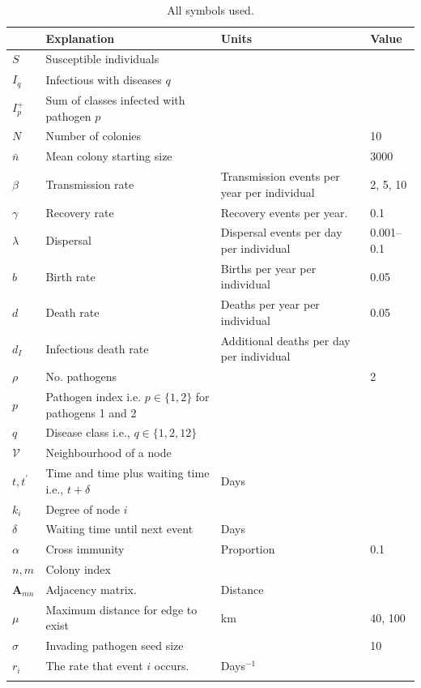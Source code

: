 \begin{table}[b!]

\begin{tabular}{lp{5.6cm}p{4.3cm}l}
 & Explanation & Units&Value\\
\hline
$S$ & Susceptible individuals &&\\
$I_q$ & Infectious with diseases $q$ &&\\
$I^+_p$ & Sum of classes infected with pathogen $p$ &\\
$N$ & Number of colonies&& 10\\
$\bar{n}$ & Mean colony starting size && 3000\\
$\beta$ & Transmission rate & Transmission events per year per individual& 2, 5, 10\\
$\gamma$ & Recovery rate & Recovery events per year. & 0.1\\
$\lambda$ & Dispersal & Dispersal events per day per individual& 0.001--0.1\\
$b$ & Birth rate & Births per year per individual& 0.05\\
$d$ & Death rate & Deaths per year per individual & 0.05\\
$d_I$ & Infectious death rate & Additional deaths per day per individual&\\
$\rho$ & No. pathogens && 2\\
$p$ &  Pathogen index i.e. $p\in\{1,2\}$ for pathogens 1 and 2 & &\\
$q$ & Disease class i.e., $q\in\{1,2,12\}$&\\
$\mathcal{V}$ & Neighbourhood of a node &&\\
$t, t^\prime$ & Time and time plus waiting time i.e., $t+\delta$ & Days&\\
$k_i$ & Degree of node $i$ &&\\
$\delta$ & Waiting time until next event & Days&\\
$\alpha$ & Cross immunity & Proportion& 0.1\\
$n, m$ & Colony index &&\\
$\bm{A}_{mn}$ & Adjacency matrix. & Distance &\\
$\mu$ & Maximum distance for edge to exist & km& 40, 100\\
$\sigma$ & Invading pathogen seed size & & 10\\
$r_i$ & The rate that event $i$ occurs. & Days$^{-1}$&\\
&&&\\
\end{tabular}
\caption{All symbols used.}
\label{t:params}
\end{table}




